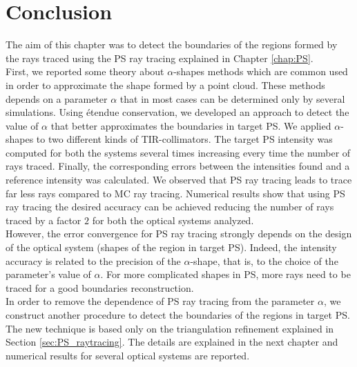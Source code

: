 \section{Conclusion}
The aim of this chapter was to detect the boundaries of the regions formed by the rays traced using the PS ray tracing explained in Chapter \ref{chap:PS}.\\
\indent First, we reported some theory about $\alpha$-shapes methods which are common used in order to approximate the shape formed by a point cloud. 
These methods depends on a parameter $\alpha$ that in most cases can be determined only by several simulations. 
Using \'{e}tendue conservation, we developed an approach to detect the value of $\alpha$ that better approximates the boundaries in target PS. 
We applied $\alpha$-shapes to two different kinds of TIR-collimators. The target PS intensity was computed for both the systems several times increasing every time the number of rays traced. Finally, the corresponding errors between the intensities found and a reference intensity was calculated. We observed that PS ray tracing leads to trace far less rays compared to MC ray tracing. Numerical results show that using PS ray tracing the desired accuracy can be achieved reducing the number of rays traced by a factor $2$ for both the optical systems analyzed.\\ \indent 
However, the error convergence for PS ray tracing strongly depends on the design of the optical system (shapes of the region in target PS). Indeed, the intensity accuracy is related to the precision of the $\alpha$-shape, that is, to the choice of the parameter's value of $\alpha$. For more complicated shapes in PS, more rays need to be traced for a good boundaries reconstruction.\\ \indent
In order to remove the dependence of PS ray tracing from the parameter $\alpha$, we construct another procedure to detect the boundaries of the regions in target PS. 
The new technique is based only on the triangulation refinement explained in Section \ref{sec:PS_raytracing}. The details are explained in the next chapter and numerical results for several optical systems are reported. 











































